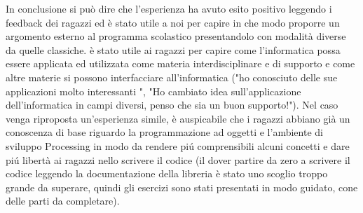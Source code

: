 In conclusione si può dire che l'esperienza ha avuto esito positivo leggendo i feedback dei ragazzi ed è stato utile a noi per capire in che modo proporre un argomento esterno al programma scolastico presentandolo con modalità diverse da quelle classiche. è stato utile ai ragazzi per capire come l'informatica possa essere applicata ed utilizzata come materia interdisciplinare e di supporto e come altre materie si possono interfacciare all'informatica ("ho conosciuto delle sue applicazioni molto interessanti ", "Ho cambiato idea sull'applicazione dell'informatica in campi diversi, penso che sia un buon supporto!"). Nel caso venga riproposta un'esperienza simile, è auspicabile che i ragazzi abbiano già un conoscenza di base riguardo la programmazione ad oggetti e l'ambiente di sviluppo Processing in modo da rendere piú comprensibili alcuni concetti e dare piú libertà ai ragazzi nello scrivere il codice (il dover partire da zero a scrivere il codice leggendo la documentazione della libreria è stato uno scoglio troppo grande da superare, quindi gli esercizi sono stati presentati in modo guidato, cone delle parti da completare).
